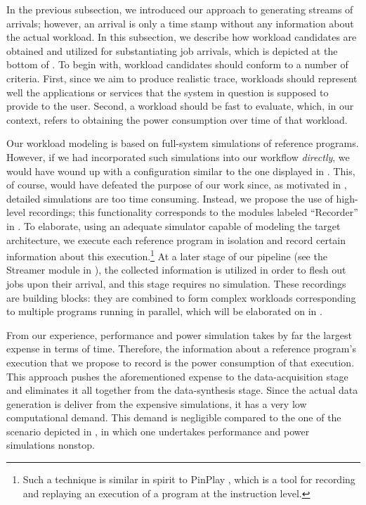 In the previous subsection, we introduced our approach to generating streams of
arrivals; however, an arrival is only a time stamp without any information about
the actual workload. In this subsection, we describe how workload candidates are
obtained and utilized for substantiating job arrivals, which is depicted at the
bottom of . To begin with, workload candidates should conform
to a number of criteria. First, since we aim to produce realistic trace,
workloads should represent well the applications or services that the system in
question is supposed to provide to the user. Second, a workload should be fast
to evaluate, which, in our context, refers to obtaining the power consumption
over time of that workload.

Our workload modeling is based on full-system simulations of reference programs.
However, if we had incorporated such simulations into our workflow
\emph{directly}, we would have wound up with a configuration similar to the one
displayed in . This, of course, would have defeated the
purpose of our work since, as motivated in , detailed
simulations are too time consuming. Instead, we propose the use of high-level
recordings; this functionality corresponds to the modules labeled ``Recorder''
in . To elaborate, using an adequate simulator capable of
modeling the target architecture, we execute each reference program in isolation
and record certain information about this execution.\footnote{Such a technique
is similar in spirit to PinPlay \cite{patil2010}, which is a tool for recording
and replaying an execution of a program at the instruction level.} At a later
stage of our pipeline (see the Streamer module in ), the
collected information is utilized in order to flesh out jobs upon their arrival,
and this stage requires no simulation. These recordings are building blocks:
they are combined to form complex workloads corresponding to multiple programs
running in parallel, which will be elaborated on in .

From our experience, performance and power simulation takes by far the largest
expense in terms of time. Therefore, the information about a reference program's
execution that we propose to record is the power consumption of that execution.
This approach pushes the aforementioned expense to the data-acquisition stage
and eliminates it all together from the data-synthesis stage. Since the actual
data generation is deliver from the expensive simulations, it has a very low
computational demand. This demand is negligible compared to the one of the
scenario depicted in , in which one undertakes performance and
power simulations nonstop.

